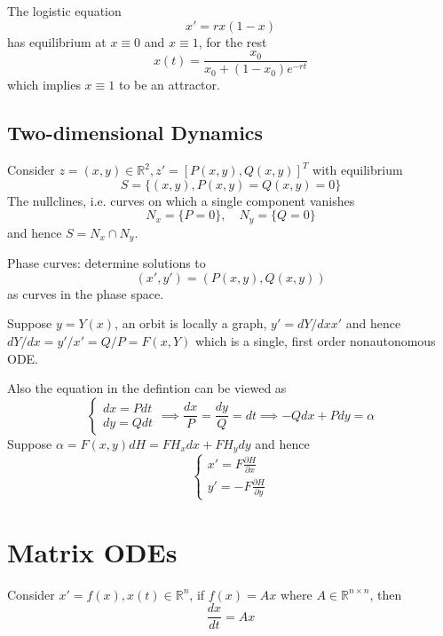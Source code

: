 \documentclass{article}
\begin{document}
\begin{example}
    The logistic equation
    \[x' = rx(1-x)\]
    has equilibrium at $x \equiv 0$ and $x \equiv 1$, for the rest
    \[
    x(t) = \dfrac{x_0}{x_0 + (1-x_0)e^{-rt}}
    \]
    which implies $x\equiv 1$ to be an attractor.
\end{example}

\subsection{Two-dimensional Dynamics}

Consider $z = (x,y) \in \mathbb{R}^2, z' = [P(x,y),Q(x,y)]^T$ with equilibrium
\[S = \{(x,y), P(x,y) = Q(x,y) = 0\}\]
The nullclines, i.e. curves on which a single component vanishes
\[
N_x = \{P = 0\},\quad N_y = \{Q= 0\}
\]
and hence $S = N_x\cap N_y$.

\begin{definition}
    Phase curves: determine solutions to
    \[(x',y') = (P(x,y),Q(x,y))\]
    as curves in the phase space.
\end{definition}

Suppose $y = Y(x)$, an orbit is locally a graph, $y' = dY/dx x'$ and hence $dY/dx = y'/x' = Q/P = F(x,Y)$ which is a single, first order nonautonomous ODE.\par
Also the equation in the defintion can be viewed as
\[
\begin{cases}
    dx = Pdt \\
    dy = Qdt
\end{cases} \implies \dfrac{dx}{ P} = \dfrac{dy}{Q} = dt \implies -Q dx + Pdy = \alpha
\]
Suppose $\alpha = F(x,y)dH = F H_x dx + FH_y dy$ and hence
\[
\begin{cases}
    x' = F\tfrac{\partial H}{\partial x} \\
    y' = -F\tfrac{\partial H}{\partial y} 
\end{cases}
\]

\section{Matrix ODEs}

Consider $x' = f(x) , x(t) \in \mathbb{R}^n$, if $f(x) = Ax$ where $A \in \mathbb{R}^{n\times n}$, then
\[
\dfrac{dx}{dt} = Ax
\]




\end{document}
